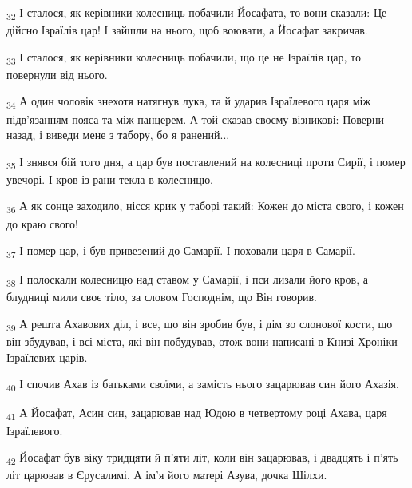 \begin{tcolorbox}
\textsubscript{32} І сталося, як керівники колесниць побачили Йосафата, то вони сказали: Це дійсно Ізраїлів цар! І зайшли на нього, щоб воювати, а Йосафат закричав.
\end{tcolorbox}
\begin{tcolorbox}
\textsubscript{33} І сталося, як керівники колесниць побачили, що це не Ізраїлів цар, то повернули від нього.
\end{tcolorbox}
\begin{tcolorbox}
\textsubscript{34} А один чоловік знехотя натягнув лука, та й ударив Ізраїлевого царя між підв'язанням пояса та між панцерем. А той сказав своєму візникові: Поверни назад, і виведи мене з табору, бо я ранений...
\end{tcolorbox}
\begin{tcolorbox}
\textsubscript{35} І знявся бій того дня, а цар був поставлений на колесниці проти Сирії, і помер увечорі. І кров із рани текла в колесницю.
\end{tcolorbox}
\begin{tcolorbox}
\textsubscript{36} А як сонце заходило, нісся крик у таборі такий: Кожен до міста свого, і кожен до краю свого!
\end{tcolorbox}
\begin{tcolorbox}
\textsubscript{37} І помер цар, і був привезений до Самарії. І поховали царя в Самарії.
\end{tcolorbox}
\begin{tcolorbox}
\textsubscript{38} І полоскали колесницю над ставом у Самарії, і пси лизали його кров, а блудниці мили своє тіло, за словом Господнім, що Він говорив.
\end{tcolorbox}
\begin{tcolorbox}
\textsubscript{39} А решта Ахавових діл, і все, що він зробив був, і дім зо слонової кости, що він збудував, і всі міста, які він побудував, отож вони написані в Книзі Хроніки Ізраїлевих царів.
\end{tcolorbox}
\begin{tcolorbox}
\textsubscript{40} І спочив Ахав із батьками своїми, а замість нього зацарював син його Ахазія.
\end{tcolorbox}
\begin{tcolorbox}
\textsubscript{41} А Йосафат, Асин син, зацарював над Юдою в четвертому році Ахава, царя Ізраїлевого.
\end{tcolorbox}
\begin{tcolorbox}
\textsubscript{42} Йосафат був віку тридцяти й п'яти літ, коли він зацарював, і двадцять і п'ять літ царював в Єрусалимі. А ім'я його матері Азува, дочка Шілхи.
\end{tcolorbox}

